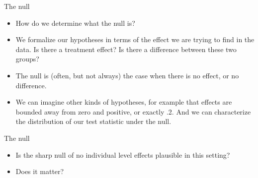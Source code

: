 \documentclass[xcolor={dvipsnames},handout]{beamer}
\begin{document}

\begin{frame}{The null}

\begin{itemize}
\item How do we determine what the null is?
\item We formalize our hypotheses in terms of the effect we are trying to find in the data. Is there a treatment effect? Is there a difference between these two groups?
\item The null is (often, but not always) the case when there is no effect, or no difference.
\item We can imagine other kinds of hypotheses, for example that effects are bounded away from zero and positive, or exactly .2. And we can characterize the distribution of our test statistic under the null.
\end{itemize}

\end{frame}



\begin{frame}{The null}

\begin{itemize}
\item Is the sharp null of no individual level effects plausible in this setting?
\item Does it matter?
\end{itemize}

\end{frame}
\end{document}
